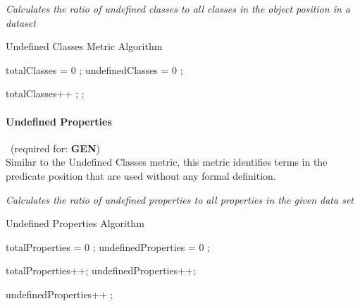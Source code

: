 \begin{mdframed}[style=metricdefinition]
\emph{Calculates the ratio of undefined classes to all classes in the object position in a dataset}
\end{mdframed}

\begin{algorithm}
\caption{Undefined Classes Metric Algorithm}\label{lst:undefCl}
\begin{algorithmic}[1]
\State totalClasses = 0 ;
\State undefinedClasses = 0 ;
\EndProcedure

  totalClasses++ ;\EndIf
{}; \EndIf
{}
\EndProcedure
\end{algorithmic}
\end{algorithm}

\paragraph{Undefined Properties}~(required for: \textbf{GEN})~\\ 
Similar to the Undefined Classes metric, this metric identifies terms in the predicate position that are used without any formal definition.

\begin{mdframed}[style=metricdefinition]
\emph{Calculates the ratio of undefined properties to all properties in the given data set}
\end{mdframed}

\begin{algorithm}
\caption{Undefined Properties Algorithm}
\begin{algorithmic}[1]
\State totalProperties = 0 ;
\State undefinedProperties = 0 ;
\EndProcedure

 totalProperties++; \EndIf 
{} undefinedProperties++; \EndIf

 undefinedProperties++ ; \EndIf
{}
\EndProcedure
\end{algorithmic}
\end{algorithm}

